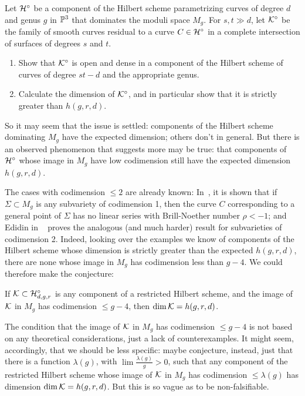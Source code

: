 \begin{exercise}
Let ${\cal H}^\circ$ be a component of the Hilbert scheme parametrizing curves of degree $d$ and genus $g$ in ${\mathbb P}^3$ that dominates the moduli space $M_g$. For $s, t \gg d$, let ${\cal K}^\circ$ be the family of smooth curves residual to a curve $C \in  {\cal H}^\circ$ in a complete intersection of surfaces of degrees $s$ and $t$.
\begin{enumerate}
\item Show that ${\cal K}^\circ$ is open and dense in a component of the Hilbert scheme of curves of degree $st-d$ and the appropriate genus.
\item Calculate the dimension of ${\cal K}^\circ$, and in particular show that it is strictly greater than $h(g,r,d)$.
\end{enumerate}
\end{exercise}

So it may seem that the issue is settled: components of the Hilbert scheme dominating $M_g$ have the expected dimension; others don't in general. But there is an observed phenomenon that suggests more may be true: that components of ${\cal H}^\circ$ whose image in $M_g$ have low codimension still have the expected dimension $h(g,r,d)$. 

The cases with codimension $\leq 2$ are already known: In~\cite{Eisenbud-Harris}, it is shown that if $\Sigma \subset M_g$ is any subvariety of codimension 1, then the curve $C$ corresponding to a general point of $\Sigma$ has no linear series with Brill-Noether number $\rho < -1$; and Edidin in ~\cite{Edidin} proves the analogous (and much harder) result for subvarieties of codimension 2. Indeed, looking over the examples we know of components of the Hilbert scheme whose dimension is strictly greater than the expected $h(g,r,d)$, there are none whose image in $M_g$ has codimension less than $g-4$. We could therefore make the conjecture:

\begin{conjecture}
If ${\cal K} \subset {\cal H}^\circ_{d,g,r}$ is any component of a restricted Hilbert scheme, and the image of ${\cal K}$ in $M_g$ has codimension $\leq g-4$, then $\dim {\cal K} = h(g,r,d)$.
\end{conjecture}

The condition that the image of ${\cal K}$ in $M_g$ has codimension $\leq g-4$ is not based on any theoretical considerations, just a lack of counterexamples. It might seem, accordingly, that we should be less specific: maybe conjecture, instead, just that there is a function $\lambda(g)$, with $\lim \frac{\lambda(g)}{g} > 0$, such that any component of the restricted Hilbert scheme whose image of ${\cal K}$ in $M_g$ has codimension $\leq \lambda(g)$ has dimension $\dim {\cal K} = h(g,r,d)$. But this is so vague as to be non-falsifiable.

